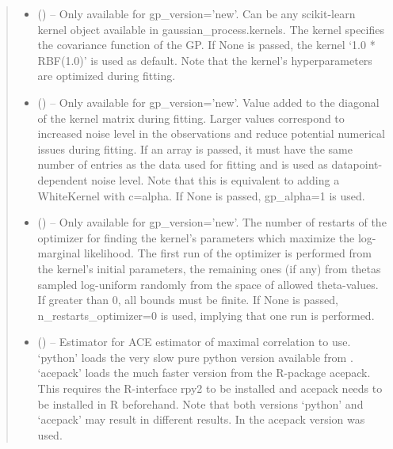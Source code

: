 \documentclass[letterpaper,10pt,english]{sphinxmanual}
\begin{document}
\begin{fulllineitems}
\begin{quote}
\begin{description}
\begin{itemize}
\item {} 
 (\sphinxstyleliteralemphasis{, }\sphinxstyleliteralemphasis{ (}\sphinxstyleliteralemphasis{)}\sphinxstyleliteralemphasis{}) -- Only available for gp\_version='new'. Can be any scikit-learn kernel
object available in gaussian\_process.kernels. The kernel specifies the
covariance function of the GP. If None is passed, the kernel `1.0 *
RBF(1.0)' is used as default. Note that the kernel's hyperparameters are
optimized during fitting.

\item {} 
 (\sphinxstyleliteralemphasis{, }\sphinxstyleliteralemphasis{ (}\sphinxstyleliteralemphasis{)}\sphinxstyleliteralemphasis{}) -- Only available for gp\_version='new'. Value added to the diagonal of the
kernel matrix during fitting. Larger values correspond to increased
noise level in the observations and reduce potential numerical issues
during fitting. If an array is passed, it must have the same number of
entries as the data used for fitting and is used as datapoint-dependent
noise level. Note that this is equivalent to adding a WhiteKernel with
c=alpha. If None is passed, gp\_alpha=1 is used.

\item {} 
 (\sphinxstyleliteralemphasis{, }\sphinxstyleliteralemphasis{ (}\sphinxstyleliteralemphasis{)}\sphinxstyleliteralemphasis{}) -- Only available for gp\_version='new'. The number of restarts of the
optimizer for finding the kernel's parameters which maximize the log-
marginal likelihood. The first run of the optimizer is performed from
the kernel's initial parameters, the remaining ones (if any) from thetas
sampled log-uniform randomly from the space of allowed theta-values. If
greater than 0, all bounds must be finite. If None is passed,
n\_restarts\_optimizer=0 is used, implying that one run is performed.

\item {} 
 (\sphinxstyleliteralemphasis{, }) -- Estimator for ACE estimator of maximal correlation to use. `python'
loads the very slow pure python version available from
. `acepack' loads the much faster
version from the R-package acepack. This requires the R-interface
rpy2 to be installed and acepack needs to be installed in R beforehand.
Note that both versions `python' and `acepack' may result in different
results. In \sphinxfootnotemark[1] the acepack version was used.


\end{itemize}
\end{description}
\end{quote}
\end{fulllineitems}
\end{document}

